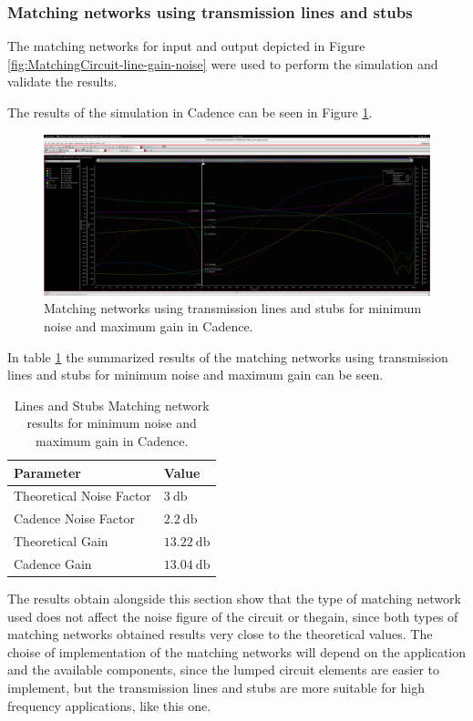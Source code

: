 \subsubsection{Matching networks using transmission lines and stubs}

The matching networks for input and output depicted in Figure \ref{fig:MatchingCircuit-line-gain-noise} were used to perform the simulation and validate the results.

The results of the simulation in Cadence can be seen in Figure \ref{fig:CadenceNoiseGainMatchingCircuitLine}.

\begin{figure}[H]
    \centering
    \includegraphics[width=1\textwidth]{Images/CAD-LinesmatchNoiseGain.png}
    \caption{Matching networks using transmission lines and stubs for minimum noise and maximum gain in Cadence.}
    \label{fig:CadenceNoiseGainMatchingCircuitLine}
\end{figure}

In table \ref{tab:NoiseGainMatchingParametersLine} the summarized results of the matching networks using transmission lines and stubs for minimum noise and maximum gain can be seen.
\begin{table}[H]
    \centering
    \caption{Lines and Stubs Matching network results for minimum noise and maximum gain in Cadence.}
    \begin{tabularx}{\textwidth}{>{\centering\arraybackslash}X >{\centering\arraybackslash}X}
        \toprule
        \textbf{Parameter} & \textbf{Value} \\
        \midrule
        Theoretical Noise Factor  & $\SI{3}{\decibel}$ \\
        \midrule
        Cadence Noise Factor & $\SI{2.2}{\decibel}$ \\
        \midrule
        Theoretical Gain & $\SI{13.22}{\decibel}$ \\
        \midrule
        Cadence Gain & $\SI{13.04}{\decibel}$ \\
        \bottomrule
    \end{tabularx}
    \label{tab:NoiseGainMatchingParametersLine}
\end{table}

The results obtain alongside this section show that the type of matching network used does not affect the noise figure of the circuit or thegain, since both types of matching networks obtained results very close to the theoretical values. The choise of implementation of the matching networks will depend on the application and the available components, since the lumped circuit elements are easier to implement, but the transmission lines and stubs are more suitable for high frequency applications, like this one.